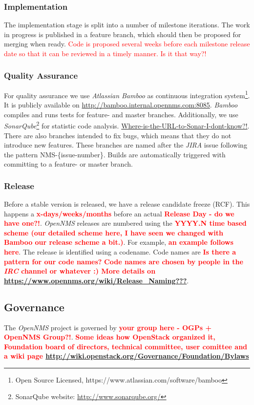 \subsubsection{Implementation}
The implementation stage is split into a number of milestone iterations. The work in progress is published in a feature branch, which should then be proposed for merging when ready. \textcolor{red}{Code is proposed several weeks before each milestone release date so that it can be reviewed in a timely manner. Is it that way?!}

\subsubsection{Quality Assurance}
For quality assurance we use \emph{Atlassian Bamboo} as continuous integration system\footnote{Open Source Licensed, https://www.atlassian.com/software/bamboo}. It is publicly available on \url{http://bamboo.internal.opennms.com:8085}. \emph{Bamboo} compiles and runs tests for feature- and master branches. Additionally, we use \emph{SonarQube}\footnote{SonarQube website: \url{http://www.sonarqube.org/}} for statistic code analysis. \textcolor{red}{\url{Where-is-the-URL-to-Sonar-I-dont-know?!}}. There are also branches intended to fix bugs, which means that they do not introduce new features. These branches are named after the \emph{JIRA} issue following the pattern NMS-\{issue-number\}. Builds are automatically triggered with committing to a feature- or master branch.

\subsubsection{Release}
Before a stable version is released, we have a release candidate freeze (RCF). This happens a \textbf{\textcolor{red}{x-days/weeks/months}} before an actual \textbf{\textcolor{red}{Release Day - do we have one?!}}. \emph{OpenNMS} releases are numbered using the \textbf{\textcolor{red}{YYYY.N time based scheme (our detailed scheme here, I have seen we changed with Bamboo our release scheme a bit.)}}. For example, \textbf{\textcolor{red}{an example follows here}}. The release is identified using a codename. Code names are \textbf{\textcolor{red}{Is there a pattern for our code names?}} \textbf{\textcolor{red}{Code names are chosen by people in the \emph{IRC} channel or whatever :) More details on \url{https://www.opennms.org/wiki/Release_Naming???}}}.

\subsection{Governance}
The \emph{OpenNMS} project is governed by \textbf{\textcolor{red}{your group here - OGPs + OpenNMS Group?!}}. \textbf{\textcolor{red}{Some ideas how OpenStack organized it, Foundation board of directors, technical committee, user comittee and a wiki page \url{http://wiki.openstack.org/Governance/Foundation/Bylaws}}}
